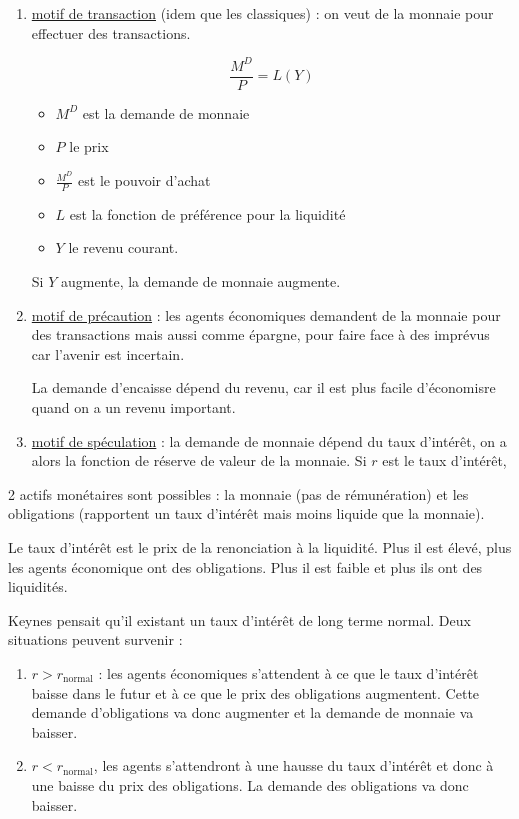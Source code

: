 	\begin{enumerate}
		\item \underline{motif de transaction} (idem que les classiques) : on veut de la monnaie pour effectuer des transactions.
		
		$$\frac{M^D}{P} = L(Y)$$
		
		\begin{itemize}
			\item $M^D$ est la demande de monnaie
			\item $P$ le prix
			\item $\frac{M^D}{P}$ est le pouvoir d'achat
			\item $L$ est la fonction de préférence pour la liquidité
			\item $Y$ le revenu courant.
		\end{itemize}
			
		Si $Y$ augmente, la demande de monnaie augmente.
		
		\item \underline{motif de précaution} : les agents économiques demandent de la monnaie pour des transactions mais aussi comme épargne, pour faire face à des imprévus car l'avenir est incertain.
		
		La demande d'encaisse dépend du revenu, car il est plus facile d'économisre quand on a un revenu important.
		
		\item \underline{motif de spéculation} : la demande de monnaie dépend du taux d'intérêt, on a alors la fonction de réserve de valeur de la monnaie. Si $r$ est le taux d'intérêt,
	\end{enumerate}
	
	2 actifs monétaires sont possibles : la monnaie (pas de rémunération) et les obligations (rapportent un taux d'intérêt mais moins liquide que la monnaie).
	
	Le taux d'intérêt est le prix de la renonciation à la liquidité. Plus il est élevé, plus les agents économique ont des obligations. Plus il est faible et plus ils ont des liquidités.
	
	Keynes pensait qu'il existant un taux d'intérêt de long terme normal. Deux situations peuvent survenir :
	
	\begin{enumerate}
		\item $r > r_{\text{normal}}$ : les agents économiques s'attendent à ce que le taux d'intérêt baisse dans le futur et à ce que le prix des obligations augmentent. Cette demande d'obligations va donc augmenter et la demande de monnaie va baisser.
		
		\item $r < r_{\text{normal}}$, les agents s'attendront à une hausse du taux d'intérêt et donc à une baisse du prix des obligations. La demande des obligations va donc baisser.
	\end{enumerate}
		
